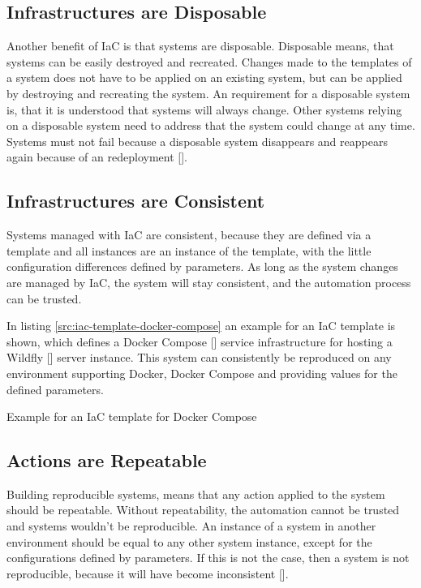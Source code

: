 \subsection{Infrastructures are Disposable}
\label{sec:iac-principles-disposable}
Another benefit of IaC is that systems are disposable. Disposable means, that systems can be easily destroyed and recreated. Changes made to the templates of a system does not have to be applied on an existing system, but can be applied by destroying and recreating the system. An requirement for a disposable system is, that it is understood that systems will always change. Other systems relying on a disposable system need to address that the system could change at any time. Systems must not fail because a disposable system disappears and reappears again because of an redeployment [\cite[p. 11]{Morris2016}].

\subsection{Infrastructures are Consistent}
\label{sec:iac-principles-consistency}
Systems managed with IaC are consistent, because they are defined via a template and all instances are an instance of the template, with the little configuration differences defined by parameters. As long as the system changes are managed by IaC, the system will stay consistent, and the automation process can be trusted.  

In listing \ref{src:iac-template-docker-compose} an example for an IaC template is shown, which defines a Docker Compose [\cite{DockerCompose2018}] service infrastructure for hosting a Wildfly [\cite{Wildfly2017}] server instance. This system can consistently be reproduced on any environment supporting Docker, Docker Compose and providing values for the defined parameters.
\begin{code}
	\caption{Example for an IaC template for Docker Compose}
	\label{src:iac-template-docker-compose}
\end{code}

\subsection{Actions are Repeatable}
\label{sec:iac-principles-repeatability}
Building reproducible systems, means that any action applied to the system should be repeatable. Without repeatability, the automation cannot be trusted and systems wouldn't be reproducible. An instance of a system in another environment should be equal to any other system instance, except for the configurations defined by parameters. If this is not the case, then a system is not reproducible, because it will have become inconsistent [\cite[p. 12 -13]{Morris2016}].

